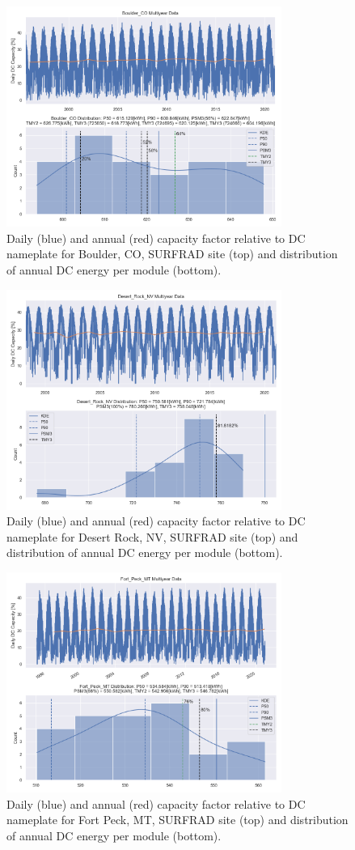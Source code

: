 \documentclass[conference]{IEEEtran}
\begin{document}
\begin{figure}[htbp]
\centerline{\includegraphics[width=9cm]{Boulder_CO.png}}
\caption{Daily (blue) and annual (red) capacity factor relative to DC nameplate for Boulder, CO, SURFRAD site (top) and distribution of annual DC energy per module (bottom).}
\label{fig:Boulder-CO}
\end{figure}

\begin{figure}[htbp]
\centerline{\includegraphics[width=9cm]{Desert_Rock_NV}}
\caption{Daily (blue) and annual (red) capacity factor relative to DC nameplate for Desert Rock, NV, SURFRAD site (top) and distribution of annual DC energy per module (bottom).}
\label{fig:Desert-Rock-NV}
\end{figure}

\begin{figure}[htbp]
\centerline{\includegraphics[width=9cm]{Fort_Peck_MT.png}}
\caption{Daily (blue) and annual (red) capacity factor relative to DC nameplate for Fort Peck, MT, SURFRAD site (top) and distribution of annual DC energy per module (bottom).}
\label{fig:Fort-Peck-MT}
\end{figure}
\end{document}
